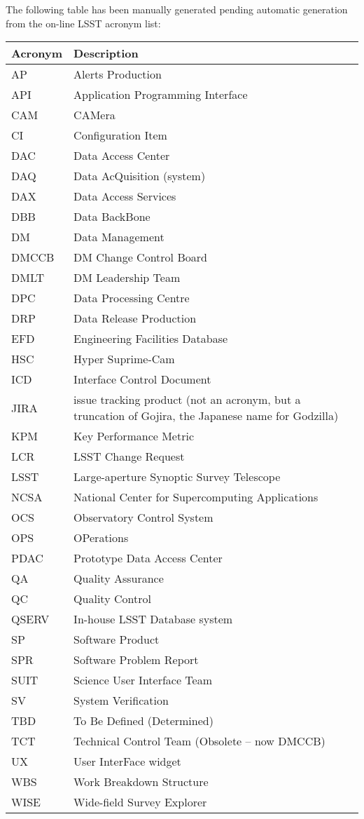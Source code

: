 The following table has been manually generated pending automatic generation from the on-line LSST acronym list:
\newline\newline%
\addtocounter{table}{-1}
\begin{longtable}{|l|p{}|}\hline
\textbf{Acronym} & \textbf{Description}  \\\hline
AP&Alerts Production \\\hline
API&Application Programming Interface \\\hline
CAM&CAMera \\\hline
CI&Configuration Item \\\hline
DAC&Data Access Center \\\hline
DAQ&Data AcQuisition (system) \\\hline
DAX&Data Access Services \\\hline
DBB&Data BackBone \\\hline
DM&Data Management \\\hline
DMCCB&DM Change Control Board \\\hline
DMLT&DM Leadership Team \\\hline
DPC&Data Processing Centre \\\hline
DRP&Data Release Production \\\hline
EFD&Engineering Facilities Database \\\hline
HSC&Hyper Suprime-Cam \\\hline
ICD&Interface Control Document \\\hline
JIRA&issue tracking product (not an acronym, but a truncation of Gojira, the Japanese name for Godzilla) \\\hline
KPM&Key Performance Metric \\\hline
LCR&LSST Change Request \\\hline
LSST&Large-aperture Synoptic Survey Telescope \\\hline
NCSA&National Center for Supercomputing Applications \\\hline
OCS&Observatory Control System \\\hline
OPS&OPerations \\\hline
PDAC&Prototype Data Access Center \\\hline
QA&Quality Assurance \\\hline
QC&Quality Control \\\hline
QSERV&In-house LSST Database system \\\hline
SP&Software Product \\\hline
SPR&Software Problem Report \\\hline
SUIT&Science User Interface Team \\\hline
SV&System Verification \\\hline
TBD&To Be Defined (Determined) \\\hline
TCT&Technical Control Team (Obsolete -- now DMCCB) \\\hline
UX&User InterFace widget \\\hline
WBS&Work Breakdown Structure \\\hline
WISE&Wide-field Survey Explorer \\\hline
\end{longtable}
